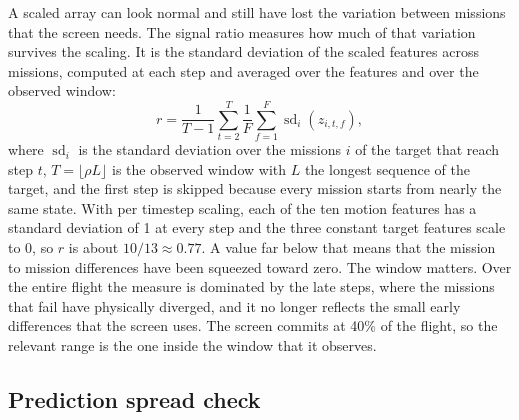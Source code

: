 A scaled array can look normal and still have lost the variation between missions that the screen needs. The signal ratio measures how much of that variation survives the scaling. It is the standard deviation of the scaled features across missions, computed at each step and averaged over the features and over the observed window:
\begin{equation}
r = \frac{1}{T - 1} \sum_{t=2}^{T}{ \frac{1}{F} \sum_{f=1}^{F}{ \operatorname{sd}_i \left( z_{i,t,f} \right) } },
\label{eq:signal}
\end{equation}
where $\operatorname{sd}_i$ is the standard deviation over the missions $i$ of the target that reach step $t$, $T = \lfloor \rho L \rfloor$ is the observed window with $L$ the longest sequence of the target, and the first step is skipped because every mission starts from nearly the same state. With per timestep scaling, each of the ten motion features has a standard deviation of 1 at every step and the three constant target features scale to 0, so $r$ is about $10/13 \approx 0.77$. A value far below that means that the mission to mission differences have been squeezed toward zero. The window matters. Over the entire flight the measure is dominated by the late steps, where the missions that fail have physically diverged, and it no longer reflects the small early differences that the screen uses. The screen commits at 40\% of the flight, so the relevant range is the one inside the window that it observes.

\subsection{Prediction spread check}
\label{sec:diag-method}

